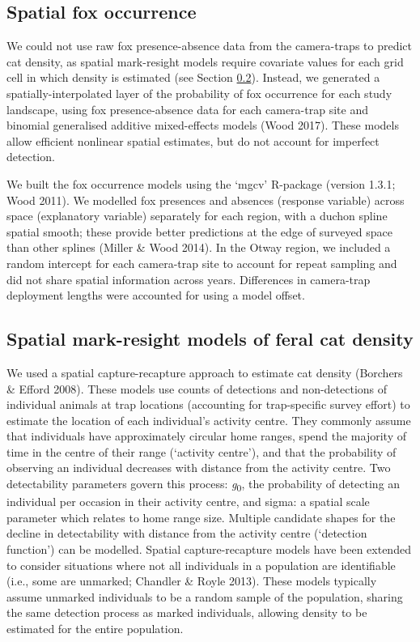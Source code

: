 \documentclass[11pt,a4paper,titlepage,twoside,openright]{style/unimelbthesis}
\begin{document}
\begin{mainmatter}
\hypertarget{density-methods-fox}{%
\subsection{Spatial fox occurrence}\label{density-methods-fox}}

We could not use raw fox presence-absence data from the camera-traps to predict cat density, as spatial mark-resight models require covariate values for each grid cell in which density is estimated (see Section \ref{density-methods-smr}). Instead, we generated a spatially-interpolated layer of the probability of fox occurrence for each study landscape, using fox presence-absence data for each camera-trap site and binomial generalised additive mixed-effects models (Wood 2017). These models allow efficient nonlinear spatial estimates, but do not account for imperfect detection.

We built the fox occurrence models using the `mgcv' R-package (version 1.3.1; Wood 2011). We modelled fox presences and absences (response variable) across space (explanatory variable) separately for each region, with a duchon spline spatial smooth; these provide better predictions at the edge of surveyed space than other splines (Miller \& Wood 2014). In the Otway region, we included a random intercept for each camera-trap site to account for repeat sampling and did not share spatial information across years. Differences in camera-trap deployment lengths were accounted for using a model offset.

\hypertarget{density-methods-smr}{%
\subsection{Spatial mark-resight models of feral cat density}\label{density-methods-smr}}

We used a spatial capture-recapture approach to estimate cat density (Borchers \& Efford 2008). These models use counts of detections and non-detections of individual animals at trap locations (accounting for trap-specific survey effort) to estimate the location of each individual's activity centre. They commonly assume that individuals have approximately circular home ranges, spend the majority of time in the centre of their range (`activity centre'), and that the probability of observing an individual decreases with distance from the activity centre. Two detectability parameters govern this process: \emph{g}\textsubscript{0}, the probability of detecting an individual per occasion in their activity centre, and sigma: a spatial scale parameter which relates to home range size. Multiple candidate shapes for the decline in detectability with distance from the activity centre (`detection function') can be modelled. Spatial capture-recapture models have been extended to consider situations where not all individuals in a population are identifiable (i.e., some are unmarked; Chandler \& Royle 2013). These models typically assume unmarked individuals to be a random sample of the population, sharing the same detection process as marked individuals, allowing density to be estimated for the entire population.


\end{mainmatter}
\end{document}
